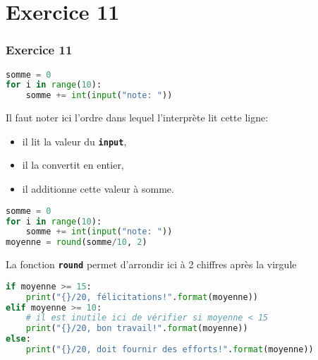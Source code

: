 \documentclass[svgnames,11pt]{beamer}
\begin{document}
\section{Exercice 11}
\begin{frame}[fragile]
    \frametitle{Exercice 11}

\begin{center}
\begin{lstlisting}[language=Python , basicstyle=\ttfamily\small, xleftmargin=1em, xrightmargin=1em]
somme = 0
for i in range(10):
    somme += int(input("note: "))
\end{lstlisting}
\label{CODE}
\end{center}
\begin{aretenir}[Remarque]
    Il faut noter ici l'ordre dans lequel l'interprète
    lit cette ligne:
\begin{itemize}
    \item il lit la valeur du \texttt{\textbf{input}},
    \item il la convertit en entier,
    \item il additionne cette valeur à somme.
\end{itemize}
\end{aretenir}
\end{frame}
\begin{frame}[fragile]
\begin{center}
\begin{lstlisting}[language=Python , basicstyle=\ttfamily\small, xleftmargin=1em, xrightmargin=1em]
somme = 0
for i in range(10):
    somme += int(input("note: "))
moyenne = round(somme/10, 2)
\end{lstlisting}
\label{CODE}
\end{center}
\begin{aretenir}[Remarque]
    La fonction \texttt{\textbf{round}} permet d'arrondir
    ici à 2 chiffres après la virgule
\end{aretenir}
\end{frame}
\begin{frame}[fragile]
    \begin{center}
    \begin{lstlisting}[language=Python , basicstyle=\ttfamily\small, xleftmargin=1em, xrightmargin=1em]
if moyenne >= 15:
    print("{}/20, félicitations!".format(moyenne))
elif moyenne >= 10:
    # il est inutile ici de vérifier si moyenne < 15
    print("{}/20, bon travail!".format(moyenne))
else:
    print("{}/20, doit fournir des efforts!".format(moyenne))
\end{lstlisting}
    \label{CODE}
    \end{center}
    
    \end{frame}
\end{document}
